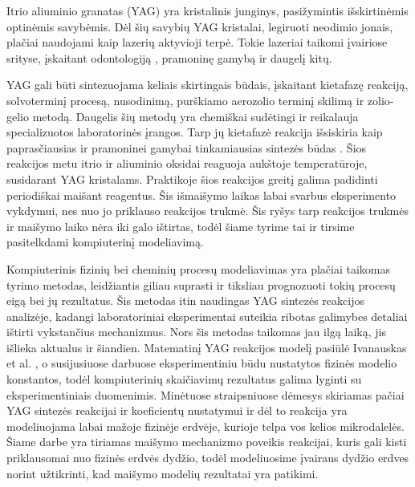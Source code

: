 
Itrio aliuminio granatas (YAG) yra kristalinis junginys, pasižymintis išskirtinėmis optinėmis savybėmis. Dėl šių savybių YAG kristalai, legiruoti neodimio jonais, plačiai naudojami kaip lazerių aktyvioji terpė. Tokie lazeriai taikomi įvairiose srityse, įskaitant odontologiją \cite{valentiUseErYAG2021}, pramoninę gamybą \cite{dubeyExperimentalStudyNd2008} ir daugelį kitų.

YAG gali būti sintezuojama keliais skirtingais būdais, įskaitant kietafazę reakciją, solvoterminį procesą, nusodinimą, purškiamo aerozolio terminį skilimą ir zolio-gelio metodą. Daugelis šių metodų yra chemiškai sudėtingi ir reikalauja specializuotos laboratorinės įrangos. Tarp jų kietafazė reakcija išsiskiria kaip paprasčiausias ir pramoninei gamybai tinkamiausias sintezės būdas \cite{zhangNovelSynthesisYAG2005}. Šios reakcijos metu itrio ir aliuminio oksidai reaguoja aukštoje temperatūroje, susidarant YAG kristalams. Praktikoje šios reakcijos greitį galima padidinti periodiškai maišant reagentus. Šis išmaišymo laikas labai svarbus eksperimento vykdymui, nes nuo jo priklauso reakcijos trukmė. Šis ryšys tarp reakcijos trukmės ir maišymo laiko nėra iki galo ištirtas, todėl šiame tyrime tai ir tirsime pasitelkdami kompiuterinį modeliavimą.

Kompiuterinis fizinių bei cheminių procesų modeliavimas yra plačiai taikomas tyrimo metodas, leidžiantis giliau suprasti ir tiksliau prognozuoti tokių procesų eigą bei jų rezultatus. Šis metodas itin naudingas YAG sintezės reakcijos analizėje, kadangi laboratoriniai eksperimentai suteikia ribotas galimybes detaliai ištirti vykstančius mechanizmus. Nors šis metodas taikomas jau ilgą laiką, jis išlieka aktualus ir šiandien. Matematinį YAG reakcijos modelį pasiūlė Ivanauskas et al. \cite{ivanauskasModellingSolidState2005}, o susijusiuose darbuose \cite{ivanauskasComputationalModellingYAG2009,mackeviciusCloserLookComputer2012} eksperimentiniu būdu nustatytos fizinės modelio konstantos, todėl kompiuterinių skaičiavimų rezultatus galima lyginti su eksperimentiniais duomenimis. Minėtuose straipsniuose dėmesys skiriamas pačiai YAG sintezės reakcijai ir koeficientų nustatymui ir dėl to reakcija yra modeliuojama labai mažoje fizinėje erdvėje, kurioje telpa vos kelios mikrodalelės. Šiame darbe yra tiriamas maišymo mechanizmo poveikis reakcijai, kuris gali kisti priklausomai nuo fizinės erdvės dydžio, todėl modeliuosime įvairaus dydžio erdves norint užtikrinti, kad maišymo modelių rezultatai yra patikimi.

